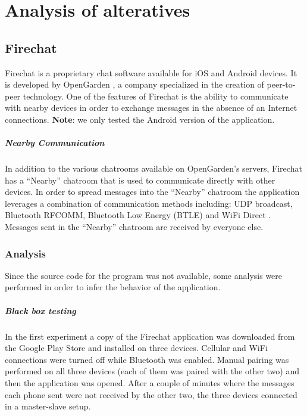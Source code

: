 \chapter{Analysis of alteratives}
\section{Firechat}
Firechat is a proprietary chat software available for iOS and Android devices.
It is developed by OpenGarden \cite{opengarden}, a company specialized in the creation of peer-to-peer technology.
One of the features of Firechat is the ability to communicate with nearby devices in order to exchange messages in the absence of an Internet connections.
\textbf{Note}: we only tested the Android version of the application.

\paragraph{Nearby Communication} In addition to the various chatrooms available on OpenGarden's servers, Firechat has a ``Nearby'' chatroom that is used to communicate directly with other devices.
In order to spread messages into the ``Nearby'' chatroom the application leverages a combination of communication methods including: UDP broadcast, Bluetooth RFCOMM, Bluetooth Low Energy (BTLE) \cite{btle} and WiFi Direct \cite{wifi-direct}.
Messages sent in the ``Nearby'' chatroom are received by everyone else.

\subsection{Analysis}
Since the source code for the program was not available, some analysis were performed in order to infer the behavior of the application.

\paragraph{Black box testing}
In the first experiment a copy of the Firechat application was downloaded from the Google Play Store \cite{firechat-google-play-store} and installed on three devices.
Cellular and WiFi connections were turned off while Bluetooth was enabled.
Manual pairing was performed on all three devices (each of them was paired with the other two) and then the application was opened.
After a couple of minutes where the messages each phone sent were not received by the other two, the three devices connected in a master-slave setup.

